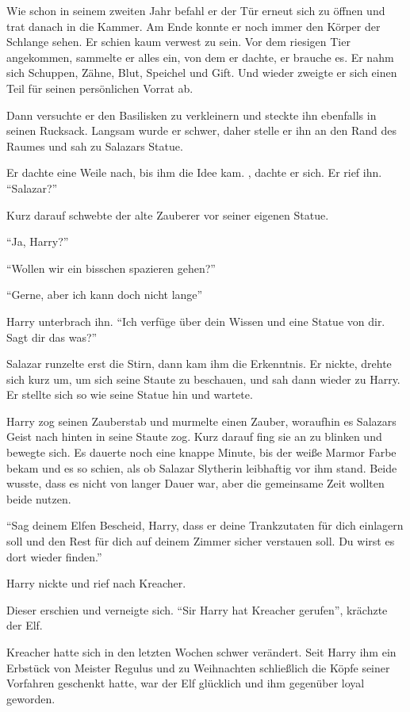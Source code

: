 Wie schon in seinem zweiten Jahr befahl er der Tür erneut sich zu öffnen und trat danach in die Kammer. Am Ende konnte er noch immer den Körper der Schlange sehen. Er schien kaum verwest zu sein. Vor dem riesigen Tier angekommen, sammelte er alles ein, von dem er dachte, er brauche es. Er nahm sich Schuppen, Zähne, Blut, Speichel und Gift. Und wieder zweigte er sich einen Teil für seinen persönlichen Vorrat ab.

Dann versuchte er den Basilisken zu verkleinern und steckte ihn ebenfalls in seinen Rucksack. Langsam wurde er schwer, daher stelle er ihn an den Rand des Raumes und sah zu Salazars Statue.

Er dachte eine Weile nach, bis ihm die Idee kam. , dachte er sich. Er rief ihn. \enquote{Salazar?}

Kurz darauf schwebte der alte Zauberer vor seiner eigenen Statue.

\enquote{Ja, Harry?}

\enquote{Wollen wir ein bisschen spazieren gehen?}

\enquote{Gerne, aber ich kann doch nicht lange\abs}

Harry unterbrach ihn. \enquote{Ich verfüge über dein Wissen und eine Statue von dir. Sagt dir das was?}

Salazar runzelte erst die Stirn, dann kam ihm die Erkenntnis. Er nickte, drehte sich kurz um, um sich seine Staute zu beschauen, und sah dann wieder zu Harry. Er stellte sich so wie seine Statue hin und wartete.

Harry zog seinen Zauberstab und murmelte einen Zauber, woraufhin es Salazars Geist nach hinten in seine Staute zog. Kurz darauf fing sie an zu blinken und bewegte sich. Es dauerte noch eine knappe Minute, bis der weiße Marmor Farbe bekam und es so schien, als ob Salazar Slytherin leibhaftig vor ihm stand. Beide wusste, dass es nicht von langer Dauer war, aber die gemeinsame Zeit wollten beide nutzen.

\enquote{Sag deinem Elfen Bescheid, Harry, dass er deine Trankzutaten für dich einlagern soll und den Rest für dich auf deinem Zimmer sicher verstauen soll. Du wirst es dort wieder finden.}

Harry nickte und rief nach Kreacher.

Dieser erschien und verneigte sich. \enquote{Sir Harry hat Kreacher gerufen}, krächzte der Elf.

Kreacher hatte sich in den letzten Wochen schwer verändert. Seit Harry ihm ein Erbstück von Meister Regulus und zu Weihnachten schließlich die Köpfe seiner Vorfahren geschenkt hatte, war der Elf glücklich und ihm gegenüber loyal geworden.

